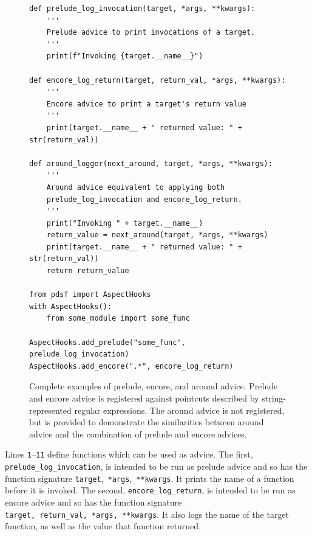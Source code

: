 \begin{figure}
    \begin{lstlisting}[style=footnotesize_python]
def prelude_log_invocation(target, *args, **kwargs):
    '''
    Prelude advice to print invocations of a target.
    '''
    print(f"Invoking {target.__name__}")
    
def encore_log_return(target, return_val, *args, **kwargs):
    '''
    Encore advice to print a target's return value
    '''
    print(target.__name__ + " returned value: " + str(return_val))
    
def around_logger(next_around, target, *args, **kwargs):
    '''
    Around advice equivalent to applying both
    prelude_log_invocation and encore_log_return.
    '''
    print("Invoking " + target.__name__)
    return_value = next_around(target, *args, **kwargs)
    print(target.__name__ + " returned value: " + str(return_val))
    return return_value

from pdsf import AspectHooks
with AspectHooks():
    from some_module import some_func

AspectHooks.add_prelude("some_func", prelude_log_invocation)
AspectHooks.add_encore(".*", encore_log_return)
    \end{lstlisting}
    \caption{Complete examples of prelude, encore, and around advice. Prelude
    and encore advice is registered against
    pointcuts described by string-represented regular expressions. The around
    advice is not registered, but is provided to demonstrate the similarities
    between around advice and the combination of prelude and encore advices.}
    \label{fig:registering_an_aspect_against_aspecthooks}
\end{figure}

Lines \texttt{1}--\texttt{11} define functions which can be used as
advice. The first, \lstinline{prelude_log_invocation}, is intended to be run as
prelude advice and so has the function signature
\lstinline{target},~\lstinline{*args},~\lstinline{**kwargs}. It prints the name
of a function before it is invoked. The second, \lstinline{encore_log_return},
is intended to be run as encore advice and so has the function signature
\lstinline{target,}~\lstinline{return_val,}~\lstinline{*args,}~\lstinline{**kwargs}.
It also logs the name of the target function, as well as the value that function
returned.


